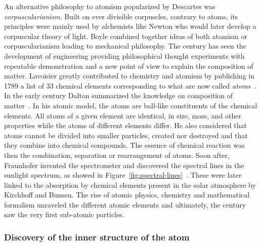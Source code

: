 	An alternative philosophy to atomism popularized by Descartes was \textit{corpuscularianism}. Built on ever divisible corpuscles, contrary to atoms, its principles were mainly used by alchemists like Newton who would later develop a corpuscular theory of light. Boyle combined together ideas of both atomism or corpuscularianism leading to mechanical philosophy. The  century has seen the development of engineering providing philosophical thought experiments with repeatable demonstration and a new point of view to explain the composition of matter. Lavoisier greatly contributed to chemistry and atomism by publishing in 1789 a list of 33 chemical elements corresponding to what are now called \textit{atoms}~\cite{LAVOISIER1789}. In the early  century Dalton summarized the knowledge on composition of matter~\cite{DALTON1808}. In his atomic model, the atoms are ball-like constituents of the chemical elements. All atoms of a given element are identical, in size, mass, and other properties while the atoms of different elements differ. He also considered that atoms cannot be divided into smaller particles, created nor destroyed and that they combine into chemical compounds. The essence of chemical reaction was then the combination, separation or rearrangement of atoms. Soon after, Fraunhofer invented the spectrometer and discovered the spectral lines in the sunlight spectrum, as showed in Figure~\ref{fig:spectral-lines}~\cite{FRAUNHOFER1814}. These were later linked to the absorption by chemical elements present in the solar atmosphere by Kirchhoff and Bunsen. The rise of atomic physics, chemistry and mathematical formalism unraveled the different atomic elements and ultimately, the  century saw the very first sub-atomic particles.
	
	\subsubsection*{Discovery of the inner structure of the atom}
	\label{chapt2:sssec:atomstructure}

